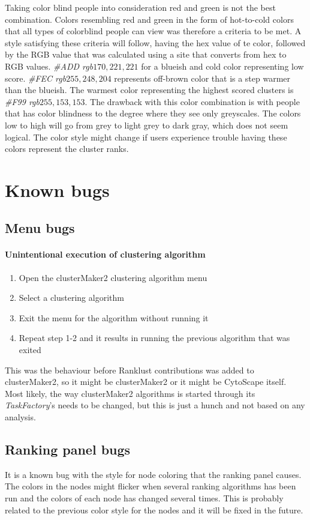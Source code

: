 Taking color blind people into consideration red and green is not the
best combination. Colors resembling red and green in the form of hot-to-cold
colors that all types of colorblind people can view was therefore a criteria to
be met. A style satisfying these criteria will follow, having the hex value of
te color\cite{color-blindness3}, followed by the RGB value that was calculated
using a site that converts from hex to RGB values\cite{color-blindness2}.
\textit{\#ADD rgb\(170,221,221\)} for a blueish and cold color representing low
score. \textit{\#FEC rgb\(255,248,204\)} represents off-brown color that is a step
warmer than the blueish. The warmest color representing the highest scored
clusters is \textit{\#F99 rgb\(255,153,153\)}. The drawback with this color
combination is with people that has color blindness to the degree where they see
only greyscales. The colors low to high will go from grey to light grey to dark
gray, which does not seem logical. The color style might change if users
experience trouble having these colors represent the cluster ranks. 

\section{Known bugs}
\subsection{Menu bugs}
\paragraph{Unintentional execution of clustering algorithm}
\begin{enumerate}
    \item Open the clusterMaker2 clustering algorithm menu
    \item Select a clustering algorithm
    \item Exit the menu for the algorithm without running it
    \item Repeat step 1-2 and it results in running the previous algorithm that
        was exited
\end{enumerate}
This was the behaviour before Ranklust contributions was added to clusterMaker2,
so it might be clusterMaker2 or it might be CytoScape itself. Most likely, the
way clusterMaker2 algorithms is started through its \textit{TaskFactory}'s needs
to be changed, but this is just a hunch and not based on any analysis.

\subsection{Ranking panel bugs}
It is a known bug with the style for node coloring that the ranking panel
causes. The colors in the nodes might flicker when several ranking algorithms
has been run and the colors of each node has changed several times. This is
probably related to the previous color style for the nodes and it will be fixed
in the future.
